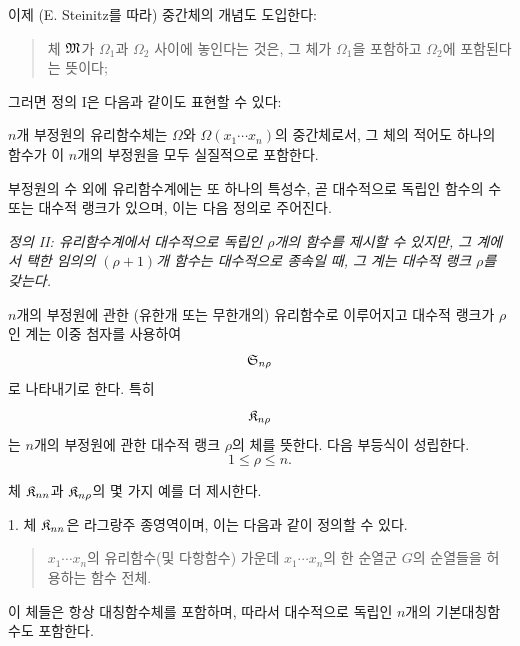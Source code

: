 이제 (E. Steinitz를 따라) 중간체의 개념도 도입한다:
\begin{quote}
\glqq{}체 $\mathfrak M$가 $\Omega_1$과 $\Omega_2$ 사이에 놓인다는 것은, 그 체가 $\Omega_1$을 포함하고 $\Omega_2$에 포함된다는 뜻이다\grqq{};
\end{quote}
그러면 정의 I은 다음과 같이도 표현할 수 있다:

$n$개 부정원의 유리함수체는 $\Omega$와 $\Omega(x_1\cdots x_n)$의 중간체로서, 그 체의 적어도 하나의 함수가 이 $n$개의 부정원을 모두 실질적으로 포함한다.

부정원의 수 외에 유리함수계에는 또 하나의 특성수, 곧 대수적으로 독립인 함수의 수 또는 대수적 랭크가 있으며, 이는 다음 정의로 주어진다.

\emph{정의 II: 유리함수계에서 대수적으로 독립인 $\rho$개의 함수를 제시할 수 있지만, 그 계에서 택한 임의의 $(\rho+1)$개 함수는 대수적으로 종속일 때, 그 계는 대수적 랭크 $\rho$를 갖는다.}

$n$개의 부정원에 관한 (유한개 또는 무한개의) 유리함수로 이루어지고 대수적 랭크가 $\rho$인 계는 이중 첨자를 사용하여
\[
  \mathfrak S_{n\rho}
\]
로 나타내기로 한다. 특히
\[
  \mathfrak K_{n\rho}
\]
는 $n$개의 부정원에 관한 대수적 랭크 $\rho$의 체를 뜻한다. 다음 부등식이 성립한다.
\[
  1\leq \rho\leq n.
\]

체 $\mathfrak K_{nn}$과 $\mathfrak K_{n\rho}$의 몇 가지 예를 더 제시한다.

1. 체 $\mathfrak K_{nn}$은 라그랑주 종영역이며, 이는 다음과 같이 정의할 수 있다.
\begin{quote}
\glqq{}$x_1\cdots x_n$의 유리함수(및 다항함수) 가운데 $x_1\cdots x_n$의 한 순열군 $G$의 순열들을 허용하는 함수 전체.
\grqq{}
\end{quote}
이 체들은 항상 대칭함수체를 포함하며, 따라서 대수적으로 독립인 $n$개의 기본대칭함수도 포함한다.

